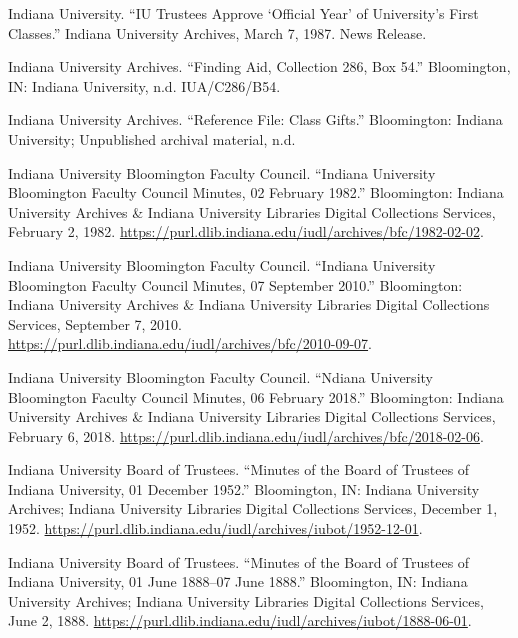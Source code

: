 \documentclass[
  american,
  letterpaper,
]{scrreprt}
\newlength{\cslhangindent}
\newenvironment{CSLReferences}[2] %
 {\begin{list}{}{%
  \setlength{\itemindent}{0pt}
  \setlength{\leftmargin}{0pt}
  \setlength{\parsep}{0pt}
  \ifodd #1
   \setlength{\leftmargin}{\cslhangindent}
   \setlength{\itemindent}{-1\cslhangindent}
  \fi
  \setlength{\itemsep}{#2\baselineskip}}}
 {\end{list}}
\begin{document}
\begin{CSLReferences}{1}{0}
Indiana University. {``{IU Trustees Approve {`Official Year'} of
University's First Classes}.''} Indiana University Archives, March 7,
1987. News Release.

Indiana University Archives. {``Finding Aid, Collection 286, Box 54.''}
Bloomington, IN: Indiana University, n.d. IUA/C286/B54.

Indiana University Archives. {``Reference File: Class Gifts.''}
Bloomington: Indiana University; Unpublished archival material, n.d.

Indiana University Bloomington Faculty Council. {``Indiana University
Bloomington Faculty Council Minutes, 02 February 1982.''} Bloomington:
Indiana University Archives \& Indiana University Libraries Digital
Collections Services, February 2, 1982.
\url{https://purl.dlib.indiana.edu/iudl/archives/bfc/1982-02-02}.

Indiana University Bloomington Faculty Council. {``Indiana University
Bloomington Faculty Council Minutes, 07 September 2010.''} Bloomington:
Indiana University Archives \& Indiana University Libraries Digital
Collections Services, September 7, 2010.
\url{https://purl.dlib.indiana.edu/iudl/archives/bfc/2010-09-07}.

Indiana University Bloomington Faculty Council. {``Ndiana University
Bloomington Faculty Council Minutes, 06 February 2018.''} Bloomington:
Indiana University Archives \& Indiana University Libraries Digital
Collections Services, February 6, 2018.
\url{https://purl.dlib.indiana.edu/iudl/archives/bfc/2018-02-06}.

Indiana University Board of Trustees. {``Minutes of the Board of
Trustees of Indiana University, 01 December 1952.''} Bloomington, IN:
Indiana University Archives; Indiana University Libraries Digital
Collections Services, December 1, 1952.
\url{https://purl.dlib.indiana.edu/iudl/archives/iubot/1952-12-01}.

Indiana University Board of Trustees. {``Minutes of the Board of
Trustees of Indiana University, 01 June 1888--07 June 1888.''}
Bloomington, IN: Indiana University Archives; Indiana University
Libraries Digital Collections Services, June 2, 1888.
\url{https://purl.dlib.indiana.edu/iudl/archives/iubot/1888-06-01}.


\end{CSLReferences}
\end{document}
